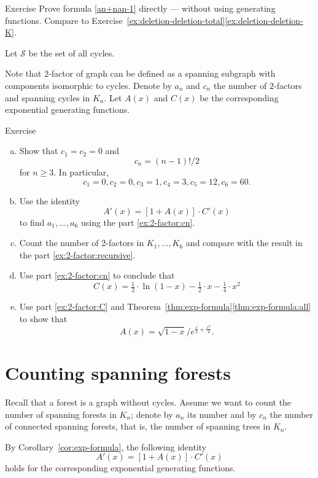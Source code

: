 \begin{thm}{Exercise}
Prove formula \ref{an+nan-1} directly --- without using generating functions.
Compare to Exercise~\ref{ex:deletion-deletion-total}\ref{ex:deletion-deletion-K}.
\end{thm}

Let $\mathcal{S}$ be the set of all cycles.

Note that $2$-factor of graph can be defined as a spanning subgraph with components isomorphic to cycles.
Denote by $a_n$ and $c_n$ the number of $2$-factors and spanning cycles in $K_n$.
Let $A(x)$ and $C(x)$ be the corresponding exponential generating functions.

\begin{thm}{Exercise}
\begin{enumerate}[(a)]
\item\label{ex:2-factor:cn} Show that $c_1=c_2=0$ and 
\[c_n=(n-1)!/2\]
for $n\ge 3$.
In particular,
\[c_1=0, c_2=0, c_3=1, c_4=3, c_5=12, c_6=60.\]
\item\label{ex:2-factor:recursive} Use the identity
\[A'(x)=[1+A(x)]\cdot C'(x)\]
to find $a_1,\dots, a_6$ using the part \ref{ex:2-factor:cn}.
\item Count the number of 2-factors in $K_1,\dots ,K_6$ and compare with the result in the part \ref{ex:2-factor:recursive}.
\item\label{ex:2-factor:C} Use part \ref{ex:2-factor:cn} to conclude that 
\[C(x)=\tfrac12\cdot\ln(1-x)-\tfrac12\cdot x-\tfrac14\cdot x^2\]
\item Use part \ref{ex:2-factor:C} and Theorem~\ref{thm:exp-formula}\ref{thm:exp-formula:all}
to show that
\[A(x)=\sqrt{1-x}/e^{\frac x2+\frac{x^2}4}.\]


\end{enumerate}

\end{thm}



\section*{Counting spanning forests}

Recall that a forest is a graph without cycles.
Assume we want to count the number of spanning forests in $K_n$;
denote by $a_n$ its number and by $c_n$ the number of connected spanning forests, that is, the number of spanning trees in $K_n$.

By Corollary~\ref{cor:exp-formula}, the following identity
\[A'(x)=[1+A(x)]\cdot C'(x)\]
holds for the corresponding exponential generating functions.

